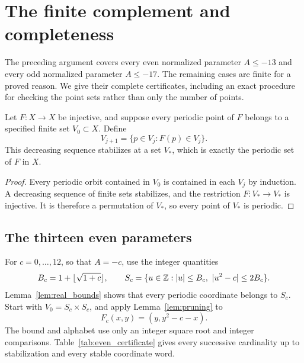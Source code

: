 \section{The finite complement and completeness}
\label{sec:finite}

The preceding argument covers every even normalized parameter
\(A\le-13\) and every odd normalized parameter \(A\le-17\).
The remaining cases are finite for a proved reason. We give their
complete certificates, including an exact procedure for checking the
point sets rather than only the number of points.

\begin{lemma}
\label{lem:pruning}
Let \(F:X\to X\) be injective, and suppose every periodic point of
\(F\) belongs to a specified finite set \(V_0\subset X\).
Define
\begin{equation}
 V_{j+1}=\{p\in V_j:F(p)\in V_j\}.
 \label{eq:pruning}
\end{equation}
This decreasing sequence stabilizes at a set \(V_*\), which is exactly
the periodic set of \(F\) in \(X\).
\end{lemma}
\begin{proof}
Every periodic orbit contained in \(V_0\) is contained in each \(V_j\)
by induction. A decreasing sequence of finite sets stabilizes, and the
restriction \(F:V_*\to V_*\) is injective. It is therefore a
permutation of \(V_*\), so every point of \(V_*\) is periodic.
\end{proof}

\subsection{The thirteen even parameters}

For \(c=0,\ldots,12\), so that \(A=-c\), use the integer quantities
\begin{equation}
 B_c=1+\lfloor\sqrt{1+c}\rfloor,\qquad
 S_c=\{u\in\mathbb{Z}:|u|\le B_c,\ |u^2-c|\le2B_c\}.
 \label{eq:even_finite_alphabet}
\end{equation}
Lemma~\ref{lem:real_bounds} shows that every periodic coordinate belongs
to \(S_c\). Start with \(V_0=S_c\times S_c\), and apply
Lemma~\ref{lem:pruning} to
\begin{equation}
 F_c(x,y)=(y,y^2-c-x).
 \label{eq:even_finite_map}
\end{equation}
The bound and alphabet use only an integer square root and integer
comparisons. Table~\ref{tab:even_certificate} gives every successive
cardinality up to stabilization and every stable coordinate word.

